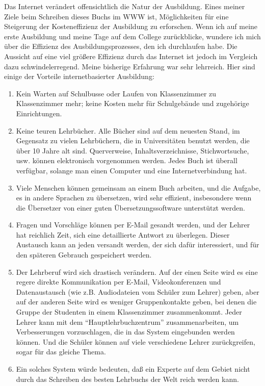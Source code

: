 Das Internet verändert offensichtlich die Natur der Ausbildung.
Eines meiner Ziele beim Schreiben dieses Buchs im WWW ist, Möglichkeiten für eine Steigerung der Kosteneffizienz der Ausbildung zu erforschen.
Wenn ich auf meine erste Ausbildung und meine Tage auf dem College zurückblicke, wundere ich mich über die Effizienz des Ausbildungsprozesses, den ich durchlaufen habe.
Die Aussicht auf eine viel größere Effizienz durch das Internet ist jedoch im Vergleich dazu schwindelerregend.
Meine bisherige Erfahrung war sehr lehrreich.
Hier sind einige der Vorteile internetbasierter Ausbildung:

\begin{enumerate}[label={\roman*.}] 
 \item Kein Warten auf Schulbusse oder Laufen von Klassenzimmer zu Klassenzimmer mehr; keine Kosten mehr für Schulgebäude und zugehörige Einrichtungen.
 \item Keine teuren Lehrbücher.
Alle Bücher sind auf dem neuesten Stand, im Gegensatz zu vielen Lehrbüchern, die in Universitäten benutzt werden, die über 10 Jahre alt sind.
Querverweise, Inhaltsverzeichnisse, Stichwortsuche, usw. können elektronisch vorgenommen werden.
Jedes Buch ist überall verfügbar, solange man einen Computer und eine Internetverbindung hat.
 \item Viele Menschen können gemeinsam an einem Buch arbeiten, und die Aufgabe, es in andere Sprachen zu übersetzen, wird sehr effizient, insbesondere wenn die Übersetzer von einer guten Übersetzungssoftware unterstützt werden.
 \item Fragen und Vorschläge können per E-Mail gesandt werden, und der Lehrer hat reichlich Zeit, sich eine detaillierte Antwort zu überlegen.
Dieser Austausch kann an jeden versandt werden, der sich dafür interessiert, und für den späteren Gebrauch gespeichert werden.
 \item Der Lehrberuf wird sich drastisch verändern.
Auf der einen Seite wird es eine regere direkte Kommunikation per E-Mail, Videokonferenzen und Datenaustausch (wie z.B. Audiodateien vom Schüler zum Lehrer) geben,
aber auf der anderen Seite wird es weniger Gruppenkontakte geben, bei denen die Gruppe der Studenten in einem Klassenzimmer zusammenkommt.
Jeder Lehrer kann mit dem \enquote{Hauptlehrbuchzentrum} zusammenarbeiten, um Verbesserungen vorzuschlagen, die in das System eingebunden werden können.
Und die Schüler können auf viele verschiedene Lehrer zurückgreifen, sogar für das gleiche Thema.
 \item Ein solches System würde bedeuten, daß ein Experte auf dem Gebiet nicht durch das Schreiben des besten Lehrbuchs der Welt reich werden kann.

\end{enumerate}
